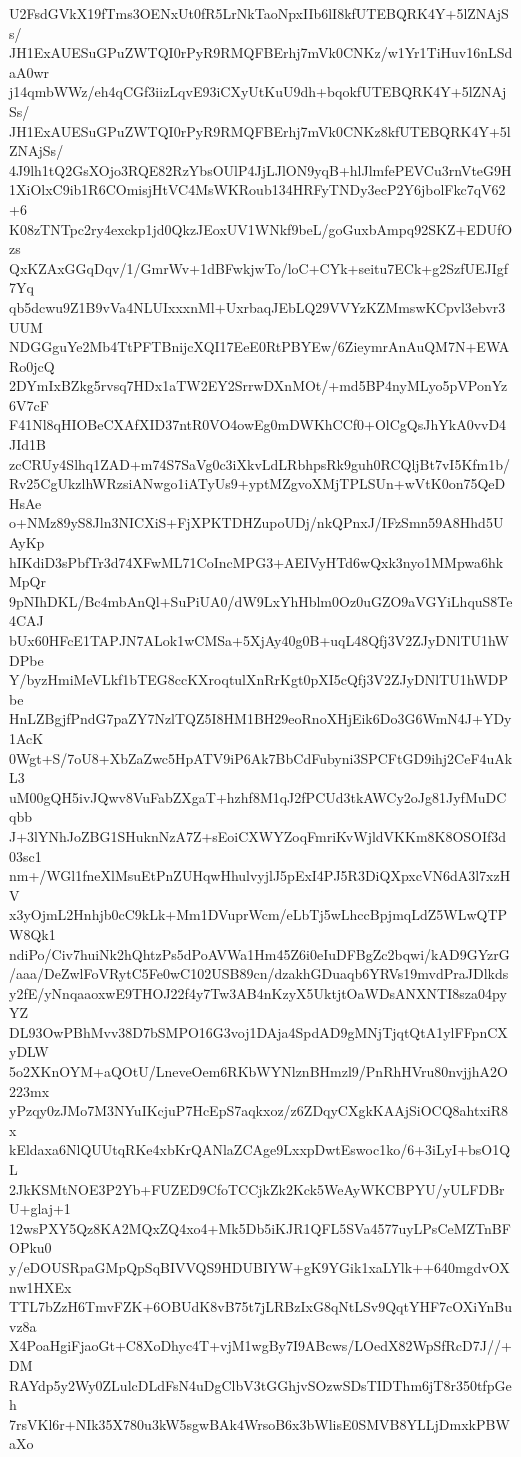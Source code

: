 U2FsdGVkX19fTms3OENxUt0fR5LrNkTaoNpxIIb6lI8kfUTEBQRK4Y+5lZNAjSs/
JH1ExAUESuGPuZWTQI0rPyR9RMQFBErhj7mVk0CNKz/w1Yr1TiHuv16nLSdaA0wr
j14qmbWWz/eh4qCGf3iizLqvE93iCXyUtKuU9dh+bqokfUTEBQRK4Y+5lZNAjSs/
JH1ExAUESuGPuZWTQI0rPyR9RMQFBErhj7mVk0CNKz8kfUTEBQRK4Y+5lZNAjSs/
4J9lh1tQ2GsXOjo3RQE82RzYbsOUlP4JjLJlON9yqB+hlJlmfePEVCu3rnVteG9H
1XiOlxC9ib1R6COmisjHtVC4MsWKRoub134HRFyTNDy3ecP2Y6jbolFkc7qV62+6
K08zTNTpc2ry4exckp1jd0QkzJEoxUV1WNkf9beL/goGuxbAmpq92SKZ+EDUfOzs
QxKZAxGGqDqv/1/GmrWv+1dBFwkjwTo/loC+CYk+seitu7ECk+g2SzfUEJIgf7Yq
qb5dcwu9Z1B9vVa4NLUIxxxnMl+UxrbaqJEbLQ29VVYzKZMmswKCpvl3ebvr3UUM
NDGGguYe2Mb4TtPFTBnijcXQI17EeE0RtPBYEw/6ZieymrAnAuQM7N+EWARo0jcQ
2DYmIxBZkg5rvsq7HDx1aTW2EY2SrrwDXnMOt/+md5BP4nyMLyo5pVPonYz6V7cF
F41Nl8qHIOBeCXAfXID37ntR0VO4owEg0mDWKhCCf0+OlCgQsJhYkA0vvD4JId1B
zcCRUy4Slhq1ZAD+m74S7SaVg0c3iXkvLdLRbhpsRk9guh0RCQljBt7vI5Kfm1b/
Rv25CgUkzlhWRzsiANwgo1iATyUs9+yptMZgvoXMjTPLSUn+wVtK0on75QeDHsAe
o+NMz89yS8Jln3NICXiS+FjXPKTDHZupoUDj/nkQPnxJ/IFzSmn59A8Hhd5UAyKp
hIKdiD3sPbfTr3d74XFwML71CoIncMPG3+AEIVyHTd6wQxk3nyo1MMpwa6hkMpQr
9pNIhDKL/Bc4mbAnQl+SuPiUA0/dW9LxYhHblm0Oz0uGZO9aVGYiLhquS8Te4CAJ
bUx60HFcE1TAPJN7ALok1wCMSa+5XjAy40g0B+uqL48Qfj3V2ZJyDNlTU1hWDPbe
Y/byzHmiMeVLkf1bTEG8ccKXroqtulXnRrKgt0pXI5cQfj3V2ZJyDNlTU1hWDPbe
HnLZBgjfPndG7paZY7NzlTQZ5I8HM1BH29eoRnoXHjEik6Do3G6WmN4J+YDy1AcK
0Wgt+S/7oU8+XbZaZwc5HpATV9iP6Ak7BbCdFubyni3SPCFtGD9ihj2CeF4uAkL3
uM00gQH5ivJQwv8VuFabZXgaT+hzhf8M1qJ2fPCUd3tkAWCy2oJg81JyfMuDCqbb
J+3lYNhJoZBG1SHuknNzA7Z+sEoiCXWYZoqFmriKvWjldVKKm8K8OSOIf3d03sc1
nm+/WGl1fneXlMsuEtPnZUHqwHhulvyjlJ5pExI4PJ5R3DiQXpxcVN6dA3l7xzHV
x3yOjmL2Hnhjb0cC9kLk+Mm1DVuprWcm/eLbTj5wLhccBpjmqLdZ5WLwQTPW8Qk1
ndiPo/Civ7huiNk2hQhtzPs5dPoAVWa1Hm45Z6i0eIuDFBgZc2bqwi/kAD9GYzrG
/aaa/DeZwlFoVRytC5Fe0wC102USB89cn/dzakhGDuaqb6YRVs19mvdPraJDlkds
y2fE/yNnqaaoxwE9THOJ22f4y7Tw3AB4nKzyX5UktjtOaWDsANXNTI8sza04pyYZ
DL93OwPBhMvv38D7bSMPO16G3voj1DAja4SpdAD9gMNjTjqtQtA1ylFFpnCXyDLW
5o2XKnOYM+aQOtU/LneveOem6RKbWYNlznBHmzl9/PnRhHVru80nvjjhA2O223mx
yPzqy0zJMo7M3NYuIKcjuP7HcEpS7aqkxoz/z6ZDqyCXgkKAAjSiOCQ8ahtxiR8x
kEldaxa6NlQUUtqRKe4xbKrQANlaZCAge9LxxpDwtEswoc1ko/6+3iLyI+bsO1QL
2JkKSMtNOE3P2Yb+FUZED9CfoTCCjkZk2Kck5WeAyWKCBPYU/yULFDBrU+glaj+1
12wsPXY5Qz8KA2MQxZQ4xo4+Mk5Db5iKJR1QFL5SVa4577uyLPsCeMZTnBFOPku0
y/eDOUSRpaGMpQpSqBIVVQS9HDUBIYW+gK9YGik1xaLYlk++640mgdvOXnw1HXEx
TTL7bZzH6TmvFZK+6OBUdK8vB75t7jLRBzIxG8qNtLSv9QqtYHF7cOXiYnBuvz8a
X4PoaHgiFjaoGt+C8XoDhyc4T+vjM1wgBy7I9ABcws/LOedX82WpSfRcD7J//+DM
RAYdp5y2Wy0ZLulcDLdFsN4uDgClbV3tGGhjvSOzwSDsTIDThm6jT8r350tfpGeh
7rsVKl6r+NIk35X780u3kW5sgwBAk4WrsoB6x3bWlisE0SMVB8YLLjDmxkPBWaXo
